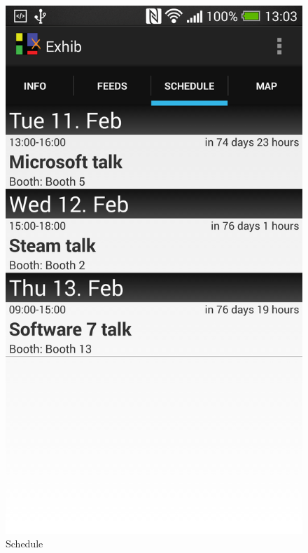 \begin{figure}[H]
\begin{minipage}[b]{0.5\columnwidth}
\centering
\includegraphics[width=0.7\columnwidth]{img/finaldesign/schedule.png}
\caption{Schedule}
\label{fig:schedule1}
\end{minipage}
\hspace{0.5cm}
\begin{minipage}[b]{0.5\columnwidth}
\centering

\end{minipage}
\end{figure}
